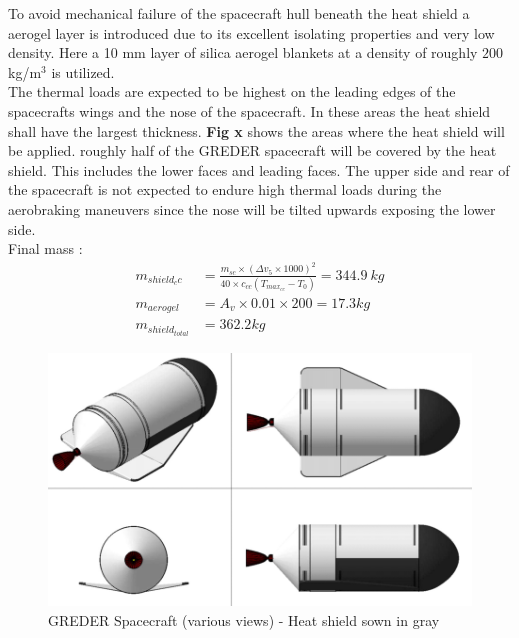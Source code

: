 To avoid mechanical failure of the spacecraft hull beneath the heat shield a aerogel layer is introduced due to its excellent isolating properties and very low density. Here a 10 mm layer of silica aerogel blankets at a density of roughly $20$0 kg/m$^3$ is utilized. \\

The thermal loads are expected to be highest on the leading edges of the spacecrafts wings and the nose of the spacecraft. In these areas the heat shield shall have the largest thickness. \textbf{Fig x} shows the areas where the heat shield will be applied. roughly half of the GREDER spacecraft will be covered by the heat shield. This includes the lower faces and leading faces. The upper side and rear of the spacecraft is not expected to endure high thermal loads during the aerobraking maneuvers since the nose will be tilted upwards exposing the lower side.\\

Final mass :
\begin{align}
	m_{shield_cc} &= \frac{m_{sc} \times (\Delta v_5\times 1000)^2}{40\times c_{cc}(T_{max_{cc}}-T_0)} = 344.9\ kg\\
	m_{aerogel} &= A_v\times 0.01\times 200 = 17.3kg\\
	m_{shield_{total}} &= 362.2 kg
\end{align}
\begin{figure}[H]
	\centering\includegraphics[width=\linewidth]{grederviews}
	\caption{GREDER Spacecraft (various views) - Heat shield sown in gray}
\end{figure}